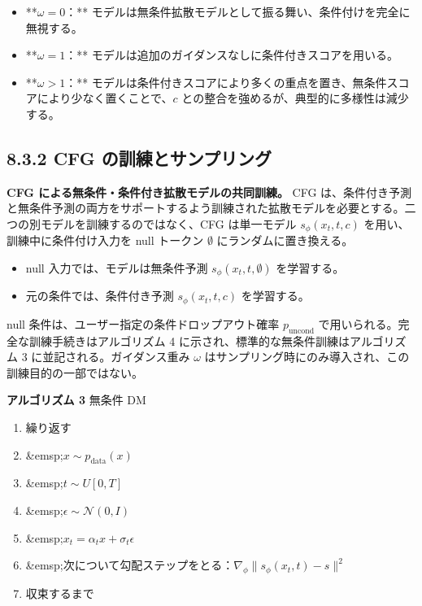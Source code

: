 \begin{itemize}
\item **$\omega=0$：** モデルは無条件拡散モデルとして振る舞い、条件付けを完全に無視する。
\item **$\omega=1$：** モデルは追加のガイダンスなしに条件付きスコアを用いる。
\item **$\omega>1$：** モデルは条件付きスコアにより多くの重点を置き、無条件スコアにより少なく置くことで、$c$ との整合を強めるが、典型的に多様性は減少する。
\end{itemize}


\subsection*{8.3.2 CFG の訓練とサンプリング}


\textbf{CFG による無条件・条件付き拡散モデルの共同訓練。} CFG は、条件付き予測と無条件予測の両方をサポートするよう訓練された拡散モデルを必要とする。二つの別モデルを訓練するのではなく、CFG は単一モデル $s_\phi(x_t,t,c)$ を用い、訓練中に条件付け入力を null トークン $\emptyset$ にランダムに置き換える。

\begin{itemize}
\item null 入力では、モデルは無条件予測 $s_\phi(x_t,t,\emptyset)$ を学習する。
\item 元の条件では、条件付き予測 $s_\phi(x_t,t,c)$ を学習する。
\end{itemize}


null 条件は、ユーザー指定の条件ドロップアウト確率 $p_{\mathrm{uncond}}$ で用いられる。完全な訓練手続きはアルゴリズム 4 に示され、標準的な無条件訓練はアルゴリズム 3 に並記される。ガイダンス重み $\omega$ はサンプリング時にのみ導入され、この訓練目的の一部ではない。

\textbf{アルゴリズム 3} 無条件 DM

\begin{enumerate}
\item 繰り返す
\item \&emsp;$x\sim p_{\mathrm{data}}(x)$
\item \&emsp;$t\sim U[0,T]$
\item \&emsp;$\epsilon\sim\mathcal{N}(0,I)$
\item \&emsp;$x_t=\alpha_t x+\sigma_t\epsilon$
\item \&emsp;次について勾配ステップをとる：$\nabla_\phi\|s_\phi(x_t,t)-s\|^2$
\item 収束するまで
\end{enumerate}


